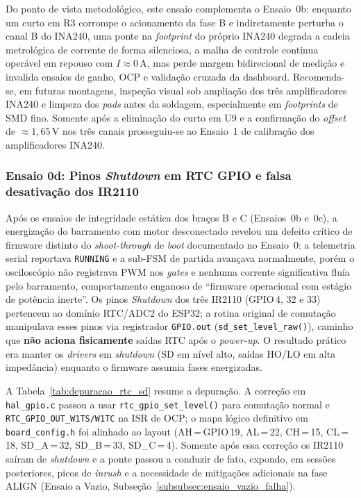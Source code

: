 Do ponto de vista metodológico, este ensaio complementa o Ensaio~0b: enquanto um curto em R3 corrompe o acionamento da fase B e indiretamente perturba o canal B do INA240, uma ponte na \textit{footprint} do próprio INA240 degrada a cadeia metrológica de corrente de forma silenciosa, a malha de controle continua operável em repouso com $I \approx 0\,\text{A}$, mas perde margem bidirecional de medição e invalida ensaios de ganho, OCP e validação cruzada da dashboard. Recomenda-se, em futuras montagens, inspeção visual sob ampliação dos três amplificadores INA240 e limpeza dos \textit{pads} antes da soldagem, especialmente em \textit{footprints} de SMD fino. Somente após a eliminação do curto em U9 e a confirmação do \textit{offset} de $\approx 1{,}65\,\text{V}$ nos três canais prosseguiu-se ao Ensaio~1 de calibração dos amplificadores INA240.

\subsubsection{Ensaio 0d: Pinos \textit{Shutdown} em RTC GPIO e falsa desativação dos IR2110}
\label{subsubsec:ensaio0d_rtc_sd}

Após os ensaios de integridade estática dos braços B e C (Ensaios~0b e~0c), a energização do barramento com motor desconectado revelou um defeito crítico de firmware distinto do \textit{shoot-through} de \textit{boot} documentado no Ensaio~0: a telemetria serial reportava \texttt{RUNNING} e a sub-FSM de partida avançava normalmente, porém o osciloscópio não registrava PWM nos \textit{gates} e nenhuma corrente significativa fluía pelo barramento, comportamento enganoso de ``firmware operacional com estágio de potência inerte''. Os pinos \textit{Shutdown} dos três IR2110 (GPIO\,4, 32 e 33) pertencem ao domínio RTC/ADC2 do ESP32; a rotina original de comutação manipulava esses pinos via registrador \texttt{GPIO.out} (\texttt{sd\_set\_level\_raw()}), caminho que \textbf{não aciona fisicamente} saídas RTC após o \textit{power-up}. O resultado prático era manter os \textit{drivers} em \textit{shutdown} (SD em nível alto, saídas HO/LO em alta impedância) enquanto o firmware assumia fases energizadas.

A Tabela~\ref{tab:depuracao_rtc_sd} resume a depuração. A correção em \texttt{hal\_gpio.c} passou a usar \texttt{rtc\_gpio\_set\_level()} para comutação normal e \texttt{RTC\_GPIO\_OUT\_W1TS/W1TC} na ISR de OCP; o mapa lógico definitivo em \texttt{board\_config.h} foi alinhado ao layout (AH\,=\,GPIO\,19, AL\,=\,22, CH\,=\,15, CL\,=\,18, SD\_A\,=\,32, SD\_B\,=\,33, SD\_C\,=\,4). Somente após essa correção os IR2110 saíram de \textit{shutdown} e a ponte passou a conduzir de fato, expondo, em sessões posteriores, picos de \textit{inrush} e a necessidade de mitigações adicionais na fase ALIGN (Ensaio a Vazio, Subseção~\ref{subsubsec:ensaio_vazio_falha}).

